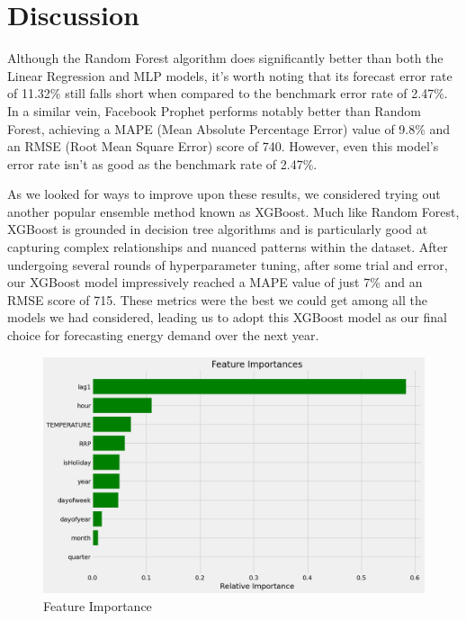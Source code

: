 \documentclass[mstat,12pt]{unswthesis}
\begin{document}
\hypertarget{s-discussion}{%
\chapter{Discussion}\label{s-discussion}}

Although the Random Forest algorithm does significantly better than both
the Linear Regression and MLP models, it's worth noting that its
forecast error rate of 11.32\% still falls short when compared to the
benchmark error rate of 2.47\%. In a similar vein, Facebook Prophet
performs notably better than Random Forest, achieving a MAPE (Mean
Absolute Percentage Error) value of 9.8\% and an RMSE (Root Mean Square
Error) score of 740. However, even this model's error rate isn't as good
as the benchmark rate of 2.47\%.

As we looked for ways to improve upon these results, we considered
trying out another popular ensemble method known as XGBoost. Much like
Random Forest, XGBoost is grounded in decision tree algorithms and is
particularly good at capturing complex relationships and nuanced
patterns within the dataset. After undergoing several rounds of
hyperparameter tuning, after some trial and error, our XGBoost model
impressively reached a MAPE value of just 7\% and an RMSE score of 715.
These metrics were the best we could get among all the models we had
considered, leading us to adopt this XGBoost model as our final choice
for forecasting energy demand over the next year.

\begin{figure}[H]
\includegraphics[width=1\linewidth,]{images/Feature_Importance} \caption{Feature Importance}\label{fig:Feature-Importance}
\end{figure}
\end{document}
